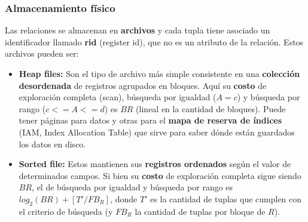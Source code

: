 \subsubsection*{Almacenamiento físico}
Las relaciones se almacenan en \textbf{archivos} y cada tupla tiene asociado un identificador llamado \textbf{rid} (register id), que no es un atributo de la relación. Estos archivos pueden ser:
\begin{itemize}
    \item \textbf{Heap files:} Son el tipo de archivo más simple consistente en una \textbf{colección desordenada} de registros agrupados en bloques. Aquí su \textbf{costo} de exploración completa (scan), búsqueda por igualdad ($A = c$) y búsqueda por rango ($c <= A <= d$) es $BR$ (lineal en la cantidad de bloques). Puede tener páginas para datos y otras para el \textbf{mapa de reserva de índices} (IAM, Index Allocation Table) que sirve para saber dónde están guardados los datos en disco.
    \item \textbf{Sorted file:} Estos mantienen sus \textbf{registros ordenados} según el valor de determinados campos. Si bien su \textbf{costo} de exploración completa sigue siendo $BR$, el de búsqueda por igualdad y búsqueda por rango es $log_2(BR) + [T'/FB_R]$, donde $T'$ es la cantidad de tuplas que cumplen con el criterio de búsqueda (y $FB_R$ la cantidad de tuplas por bloque de $R$).
\end{itemize}

